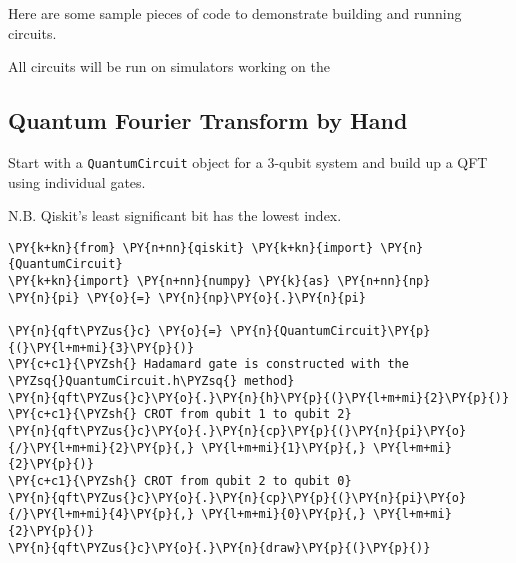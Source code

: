 Here are some sample pieces of code to demonstrate building and running
circuits.

All circuits will be run on simulators working on the

    \hypertarget{quantum-fourier-transform-by-hand}{%
\subsection{Quantum Fourier Transform by
Hand}\label{quantum-fourier-transform-by-hand}}

Start with a \texttt{QuantumCircuit} object for a 3-qubit system and
build up a QFT using individual gates.

N.B. Qiskit's least significant bit has the lowest index.

    \begin{tcolorbox}[breakable, size=fbox, boxrule=1pt, pad at break*=1mm,colback=cellbackground, colframe=cellborder]
\begin{Verbatim}[commandchars=\\\{\}]
\PY{k+kn}{from} \PY{n+nn}{qiskit} \PY{k+kn}{import} \PY{n}{QuantumCircuit}
\PY{k+kn}{import} \PY{n+nn}{numpy} \PY{k}{as} \PY{n+nn}{np}
\PY{n}{pi} \PY{o}{=} \PY{n}{np}\PY{o}{.}\PY{n}{pi}

\PY{n}{qft\PYZus{}c} \PY{o}{=} \PY{n}{QuantumCircuit}\PY{p}{(}\PY{l+m+mi}{3}\PY{p}{)}
\PY{c+c1}{\PYZsh{} Hadamard gate is constructed with the \PYZsq{}QuantumCircuit.h\PYZsq{} method}
\PY{n}{qft\PYZus{}c}\PY{o}{.}\PY{n}{h}\PY{p}{(}\PY{l+m+mi}{2}\PY{p}{)}
\PY{c+c1}{\PYZsh{} CROT from qubit 1 to qubit 2}
\PY{n}{qft\PYZus{}c}\PY{o}{.}\PY{n}{cp}\PY{p}{(}\PY{n}{pi}\PY{o}{/}\PY{l+m+mi}{2}\PY{p}{,} \PY{l+m+mi}{1}\PY{p}{,} \PY{l+m+mi}{2}\PY{p}{)}
\PY{c+c1}{\PYZsh{} CROT from qubit 2 to qubit 0}
\PY{n}{qft\PYZus{}c}\PY{o}{.}\PY{n}{cp}\PY{p}{(}\PY{n}{pi}\PY{o}{/}\PY{l+m+mi}{4}\PY{p}{,} \PY{l+m+mi}{0}\PY{p}{,} \PY{l+m+mi}{2}\PY{p}{)} 
\PY{n}{qft\PYZus{}c}\PY{o}{.}\PY{n}{draw}\PY{p}{(}\PY{p}{)}
\end{Verbatim}
\end{tcolorbox}
 
            
    
    \begin{center}
    \end{center}
    { \hspace*{\fill} \\}
    

